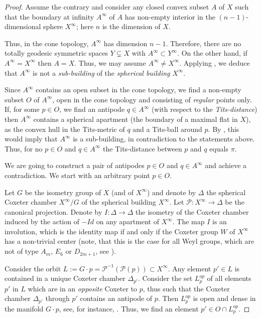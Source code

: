 \documentclass[12pt,leqno]{amsart}
\numberwithin{equation}{section}
\theoremstyle{remark}
\begin{document}
\begin{proof}
Assume the contrary and consider any closed convex subset $A$ of $X$ such that the boundary at infinity $A^{\infty}$  of $A$ has non-empty interior in the $(n-1)$-dimensional sphere 
$X^{\infty}$; here $n$ is the dimension of $X$.



 
Thus, in the cone topology, $A^{\infty}$ has dimension $n-1$. Therefore, there are no totally geodesic symmetric spaces $Y \subsetneq X$ 
with $A^{\infty} \subset Y^{\infty}$.  On the other hand, if $A^{\infty} =X^{\infty}$ then $A=X$. 
Thus, we may assume $A^{\infty} \neq X^{\infty}$.  Applying \cite[Theorem 3.1]{KleinerLeeb}, we deduce that $A^{\infty}$ is not a \emph{sub-building} of the \emph{spherical building} $X^{\infty}$.

Since $A^{\infty}$  contains an open subset in the cone topology, we find a non-empty subset $O$ of $A^{\infty}$, open in the cone topology and consisting of \emph{regular} points only.  If, for some 
$p\in O$, we find an antipode $q\in A^{\infty}$ (with respect to the \emph{Tits-distance}) then $A^{\infty}$  contains a spherical apartment  (the boundary of a maximal flat in $X$), as the convex hull in the Tits-metric of $q$ and a Tits-ball around $p$. By \cite[Theorem 1.1]{BL}, this would imply that $A^{\infty}$ is a sub-building,
 in contradiction to the statements above.   
Thus,  for no  $p\in O$ and $q\in A^{\infty}$ the Tits-distance between 
$p$ and $q$ equals $\pi$.

  We are going to construct a pair of antipodes $p\in O$ and $q\in A^{\infty}$ and achieve a contradiction.  We start with an arbitrary point $p\in O$.  


Let $G$ be the isometry group of $X$ (and of  $X^{\infty}$) and denote 
 by $\Delta$ the spherical Coxeter chamber $X^{\infty} /G$  of the spherical building $X^{\infty}$.
 Let $\mathcal P:X^{\infty} \to \Delta$ be the canonical projection.  Denote by $I:\Delta \to \Delta$ the isometry of the Coxeter chamber induced by the action of $-Id$ on any apartment of $X^{\infty}$.   The map $I$ is an involution, which is the identity map if and only if the Coxeter group $W$ of $X^{\infty}$  has a non-trivial center (note, that this is the case for all Weyl groups, which are not of type $A_m$, $E_6$ or $D_{2m+1}$, see \cite[p.71]{Hum}).

Consider the orbit $L:=G\cdot p= \mathcal P^{-1} (\mathcal P (p)) \subset X^{\infty}$. Any element $p'\in L$ is contained in a unique Coxeter chamber $\Delta _{p'}$.  Consider the set $L^{op} _p$   of all elements $p'$ in $L$  which are 
in an \emph{opposite} Coxeter to $p$, thus such that the Coxeter chamber  $\Delta _{p'}$ through $p'$ contains an antipode of $p$.  Then $L^{op} _p$ is open and dense in the manifold $G\cdot p$, see, for instance, \cite{Kap}.   Thus, we find an element  $p'\in O\cap L^{op} _p$.


\end{proof}
\end{document}
